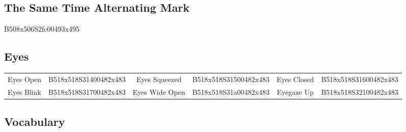 \documentclass{article}
\begin{document}
\subsection{The Same Time Alternating Mark}

\begin{center}
B508x506S2fc00493x495
\end{center}

\subsection{Eyes}

\begin{center}
\begin{tabular}{*{6}{c}}
Eyes Open &B518x518S31400482x483&Eyes Squeezed &B518x518S31500482x483&Eyes Closed&B518x518S31600482x483\\
Eyes Blink&B518x518S31700482x483&Eyes Wide Open&B518x518S31a00482x483&Eyegaze Up &B518x518S32100482x483\\
\end{tabular}
\end{center}

\subsection{Vocabulary}
\end{document}
